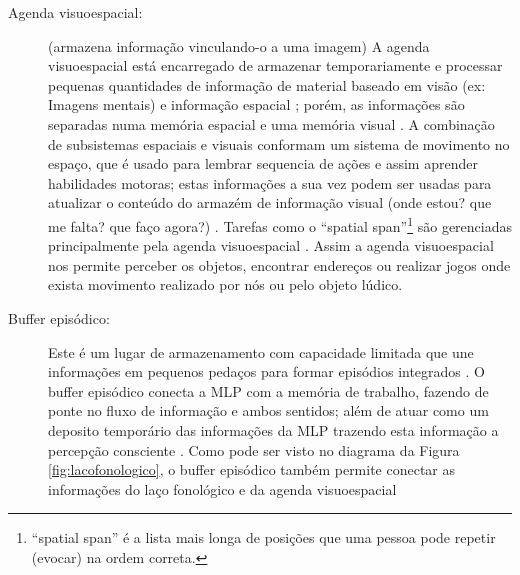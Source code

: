 \begin{description}
\item[Agenda visuoespacial:] (armazena informação vinculando-o a uma imagem)
\label{reflabel:visuoespacial}
A agenda visuoespacial está encarregado de armazenar temporariamente  e processar pequenas quantidades de informação
de material baseado em visão (ex: Imagens mentais) e informação espacial
\cite[pp. 678]{spreen2006compendium} \cite[pp. 124]{pake2019psicologia};
porém, as informações são separadas numa memória  espacial e uma memória visual \cite[pp. 124]{pake2019psicologia}.
A combinação de  subsistemas espaciais e visuais conformam um sistema de movimento no espaço, 
que é usado para lembrar sequencia de ações e assim aprender habilidades motoras;
estas informações a sua vez podem ser usadas para atualizar o conteúdo do armazém de informação visual
(onde estou? que me falta? que faço agora?)
\cite[pp. 274]{braisby2012cognitive} \cite[pp. 125]{pake2019psicologia}.
Tarefas como o ``spatial span''\footnote{``spatial span'' é a lista mais longa de posições que uma 
pessoa pode repetir (evocar) na ordem correta.} 
são gerenciadas principalmente pela agenda visuoespacial 
\cite[pp. 678]{spreen2006compendium}.
Assim a agenda visuoespacial nos permite perceber os objetos, 
encontrar endereços ou realizar jogos onde exista movimento realizado por nós ou pelo objeto lúdico. 


\item[Buffer episódico:] 
Este é um lugar de armazenamento com capacidade limitada que une informações em 
pequenos pedaços para formar episódios integrados 
\cite[pp. 678]{spreen2006compendium} \cite[pp. 126]{pake2019psicologia}.
O buffer episódico conecta a MLP com a memória de trabalho, 
fazendo de ponte no fluxo de informação e ambos sentidos;
além de atuar como um deposito temporário das informações da MLP
trazendo esta informação a percepção consciente
\cite[pp. 126]{pake2019psicologia} \cite[pp. 283-284]{braisby2012cognitive}.
Como pode ser visto no diagrama da Figura \ref{fig:lacofonologico}, 
o buffer episódico também permite conectar as informações do laço fonológico e da agenda visuoespacial
\end{description}
